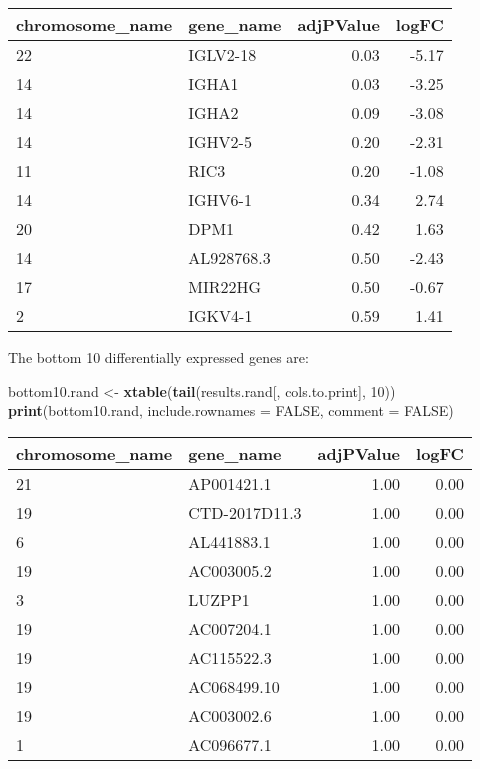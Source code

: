 \documentclass[]{article}
\newenvironment{Shaded}{\begin{snugshade}}{\end{snugshade}}
\newcommand{\KeywordTok}[1]{\textcolor[rgb]{0.13,0.29,0.53}{\textbf{{#1}}}}
\newcommand{\DataTypeTok}[1]{\textcolor[rgb]{0.13,0.29,0.53}{{#1}}}
\newcommand{\DecValTok}[1]{\textcolor[rgb]{0.00,0.00,0.81}{{#1}}}
\newcommand{\StringTok}[1]{\textcolor[rgb]{0.31,0.60,0.02}{{#1}}}
\newcommand{\OtherTok}[1]{\textcolor[rgb]{0.56,0.35,0.01}{{#1}}}
\newcommand{\NormalTok}[1]{{#1}}
\begin{document}
\begin{table}[ht]
\centering
\begin{tabular}{llrr}
  \hline
chromosome\_name & gene\_name & adjPValue & logFC \\ 
  \hline
22 & IGLV2-18 & 0.03 & -5.17 \\ 
  14 & IGHA1 & 0.03 & -3.25 \\ 
  14 & IGHA2 & 0.09 & -3.08 \\ 
  14 & IGHV2-5 & 0.20 & -2.31 \\ 
  11 & RIC3 & 0.20 & -1.08 \\ 
  14 & IGHV6-1 & 0.34 & 2.74 \\ 
  20 & DPM1 & 0.42 & 1.63 \\ 
  14 & AL928768.3 & 0.50 & -2.43 \\ 
  17 & MIR22HG & 0.50 & -0.67 \\ 
  2 & IGKV4-1 & 0.59 & 1.41 \\ 
   \hline
\end{tabular}
\end{table}

The bottom 10 differentially expressed genes are:

\begin{Shaded}
\begin{Highlighting}[]
\NormalTok{bottom10.rand <-}\StringTok{ }\KeywordTok{xtable}\NormalTok{(}\KeywordTok{tail}\NormalTok{(results.rand[, cols.to.print], }\DecValTok{10}\NormalTok{))}
\KeywordTok{print}\NormalTok{(bottom10.rand, }\DataTypeTok{include.rownames =} \OtherTok{FALSE}\NormalTok{, }\DataTypeTok{comment =} \OtherTok{FALSE}\NormalTok{)}
\end{Highlighting}
\end{Shaded}

\begin{table}[ht]
\centering
\begin{tabular}{llrr}
  \hline
chromosome\_name & gene\_name & adjPValue & logFC \\ 
  \hline
21 & AP001421.1 & 1.00 & 0.00 \\ 
  19 & CTD-2017D11.3 & 1.00 & 0.00 \\ 
  6 & AL441883.1 & 1.00 & 0.00 \\ 
  19 & AC003005.2 & 1.00 & 0.00 \\ 
  3 & LUZPP1 & 1.00 & 0.00 \\ 
  19 & AC007204.1 & 1.00 & 0.00 \\ 
  19 & AC115522.3 & 1.00 & 0.00 \\ 
  19 & AC068499.10 & 1.00 & 0.00 \\ 
  19 & AC003002.6 & 1.00 & 0.00 \\ 
  1 & AC096677.1 & 1.00 & 0.00 \\ 
   \hline
\end{tabular}
\end{table}
\end{document}
